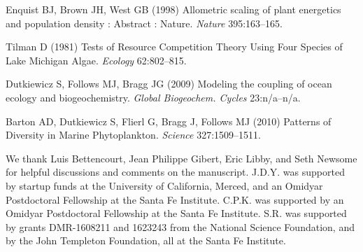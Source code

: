 \documentclass{pnastwo}
\begin{document}
\begin{article}
\begin{thebibliography}{10}
Enquist BJ, Brown JH, West GB
\newblock (1998) {Allometric scaling of plant energetics and population density
  : Abstract : Nature}.
\newblock \emph{Nature} 395:163--165.

Tilman D
\newblock (1981) {Tests of Resource Competition Theory Using Four Species of
  Lake Michigan Algae}.
\newblock \emph{Ecology} 62:802--815.

Dutkiewicz S, Follows MJ, Bragg JG
\newblock (2009) {Modeling the coupling of ocean ecology and biogeochemistry}.
\newblock \emph{Global Biogeochem. Cycles} 23:n/a--n/a.

Barton AD, Dutkiewicz S, Flierl G, Bragg J, Follows MJ
\newblock (2010) {Patterns of Diversity in Marine Phytoplankton}.
\newblock \emph{Science} 327:1509--1511.

\end{thebibliography}



\begin{acknowledgments}
  We thank Luis Bettencourt, Jean Philippe Gibert, Eric Libby, and Seth Newsome for helpful
  discussions and comments on the manuscript.  J.D.Y. was supported by
  startup funds at the University of California, Merced, and an Omidyar
  Postdoctoral Fellowship at the Santa Fe Institute.  C.P.K. was supported by
  an Omidyar Postdoctoral Fellowship at the Santa Fe Institute.  S.R. was
  supported by grants DMR-1608211 and 1623243 from the National Science
  Foundation, and by the John Templeton Foundation, all at the Santa Fe
  Institute.
\end{acknowledgments}






\end{article}
\end{document}
